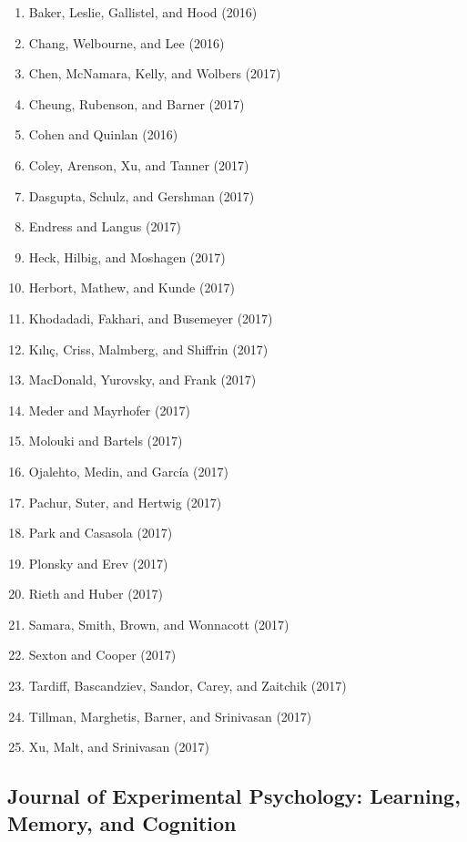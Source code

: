 \documentclass[english,man]{apa6}
\providecommand{\tightlist}{%
  \setlength{\itemsep}{0pt}\setlength{\parskip}{0pt}}
\begin{document}
\begin{enumerate}
\def\labelenumi{\arabic{enumi})}
\tightlist
\item
  Baker, Leslie, Gallistel, and Hood (2016)
\item
  Chang, Welbourne, and Lee (2016)
\item
  Chen, McNamara, Kelly, and Wolbers (2017)
\item
  Cheung, Rubenson, and Barner (2017)
\item
  Cohen and Quinlan (2016)
\item
  Coley, Arenson, Xu, and Tanner (2017)
\item
  Dasgupta, Schulz, and Gershman (2017)
\item
  Endress and Langus (2017)
\item
  Heck, Hilbig, and Moshagen (2017)
\item
  Herbort, Mathew, and Kunde (2017)
\item
  Khodadadi, Fakhari, and Busemeyer (2017)
\item
  Kılıç, Criss, Malmberg, and Shiffrin (2017)
\item
  MacDonald, Yurovsky, and Frank (2017)
\item
  Meder and Mayrhofer (2017)
\item
  Molouki and Bartels (2017)
\item
  Ojalehto, Medin, and García (2017)
\item
  Pachur, Suter, and Hertwig (2017)
\item
  Park and Casasola (2017)
\item
  Plonsky and Erev (2017)
\item
  Rieth and Huber (2017)
\item
  Samara, Smith, Brown, and Wonnacott (2017)
\item
  Sexton and Cooper (2017)
\item
  Tardiff, Bascandziev, Sandor, Carey, and Zaitchik (2017)
\item
  Tillman, Marghetis, Barner, and Srinivasan (2017)
\item
  Xu, Malt, and Srinivasan (2017)
\end{enumerate}

\subsection{Journal of Experimental Psychology: Learning, Memory, and
Cognition}\label{journal-of-experimental-psychology-learning-memory-and-cognition}
\end{document}
